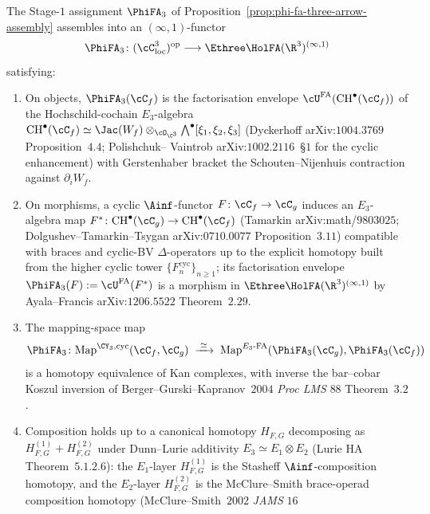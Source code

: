 \begin{theorem}
\label{thm:strictly-stronger-morphism-functoriality-local-germ}
The Stage-$1$ assignment $\PhiFA_3$ of Proposition~\ref{prop:phi-fa-three-arrow-assembly} assembles into an $(\infty,1)$-functor
\[
 \PhiFA_3 \colon (\cC_{\mathrm{loc}}^3)^{\mathrm{op}}
 \longrightarrow
 \Ethree\HolFA(\R^3)^{(\infty,1)}
\]
satisfying:
\begin{enumerate}[label=\textup{(\roman*)}]
 \item On objects, $\PhiFA_3(\cC_f)$ is the factorisation envelope
 $\cU^{\mathrm{FA}}(\mathrm{CH}^\bullet(\cC_f))$ of the
 Hochschild-cochain $E_3$-algebra
 $\mathrm{CH}^\bullet(\cC_f) \simeq \Jac(W_f) \otimes_{\cO_{\C^3}}
 \bigwedge^\bullet[\xi_1, \xi_2, \xi_3]$
 (Dyckerhoff arXiv:$1004.3769$ Proposition~$4.4$; Polishchuk--
 Vaintrob arXiv:$1002.2116$~\S$1$ for the cyclic enhancement)
 with Gerstenhaber bracket the Schouten--Nijenhuis contraction
 against $\partial_i W_f$.
 \item On morphisms, a cyclic $\Ainf$-functor $F \colon \cC_f \to
 \cC_g$ induces an $E_3$-algebra map $F^* \colon
 \mathrm{CH}^\bullet(\cC_g) \to \mathrm{CH}^\bullet(\cC_f)$
 (Tamarkin arXiv:math/$9803025$; Dolgushev--Tamarkin--Tsygan
 arXiv:$0710.0077$ Proposition~$3.11$) compatible with braces
 and cyclic-BV $\Delta$-operators up to the explicit homotopy
 built from the higher cyclic tower
 $\{F_n^{\mathrm{cyc}}\}_{n \geq 1}$; its factorisation envelope
 $\PhiFA_3(F) := \cU^{\mathrm{FA}}(F^*)$ is a morphism in
 $\Ethree\HolFA(\R^3)^{(\infty,1)}$ by Ayala--Francis
 arXiv:$1206.5522$ Theorem~$2.29$.
 \item The mapping-space map
 \[
 \PhiFA_3 \colon
 \mathrm{Map}^{\CY_3, \mathrm{cyc}}(\cC_f, \cC_g)
 \;\xrightarrow{\;\simeq\;}\;
 \mathrm{Map}^{E_3\text{-FA}}(\PhiFA_3(\cC_g), \PhiFA_3(\cC_f))
 \]
 is a homotopy equivalence of Kan complexes, with inverse the
 bar--cobar Koszul inversion of Berger--Gurski--Kapranov~$2004$
 \textit{Proc LMS} $88$ Theorem~$3.2$.
 \item Composition holds up to a canonical homotopy $H_{F, G}$
 decomposing as $H^{(1)}_{F, G} + H^{(2)}_{F, G}$ under
 Dunn--Lurie additivity $E_3 \simeq E_1 \otimes E_2$ (Lurie HA
 Theorem~$5.1.2.6$): the $E_1$-layer $H^{(1)}_{F, G}$ is the
 Stasheff $\Ainf$-composition homotopy, and the $E_2$-layer
 $H^{(2)}_{F, G}$ is the McClure--Smith brace-operad composition
 homotopy (McClure--Smith~$2002$ \textit{JAMS} $16$

\end{enumerate}
\end{theorem}
